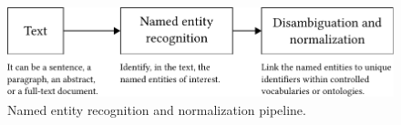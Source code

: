 \begin{figure}[!tb]
\begin{center}
\includegraphics[width=\textwidth]{img/nern/v4/img.pdf}
\caption{Named entity recognition and normalization pipeline.}
\label{fig:nern}
\end{center}
\end{figure}
